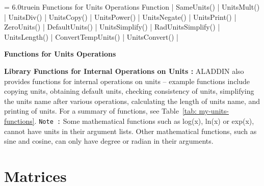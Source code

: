 \begin{table}[p]
\tablewidth = 6.0truein
\begintable
{}\tstrut\hfil Functions for Units Operations    \hfil\crthick
Function           |                        \cr
SameUnits()        |        \cr
UnitsMult()        |                         \cr
UnitsDiv()         |                           \cr
UnitsCopy()        |                      \cr
UnitsPower()       |           \cr
UnitsNegate()      |                      \cr
UnitsPrint()       |    \cr
ZeroUnits()        |                                        \cr
DefaultUnits()     |  \cr
UnitsSimplify()    |   \cr
RadUnitsSimplify() |         \cr
UnitsLength()      |          \cr
ConvertTempUnits() |      \cr
UnitsConvert()     | 
\endtable
\vspace{0.01 in}
\caption{\bf Functions for Units Operations}
\label{tab: my-units-functions}
\end{table}

\vspace{0.20 in}\noindent
{\bf Library Functions for Internal Operations on Units :}
ALADDIN also provides functions for internal operations
on units -- example functions include copying units,
obtaining default units, checking consistency of units,
simplifying the units name after various operations,
calculating the length of units name,
and printing of units. For a summary of functions,
see Table~\ref{tab: my-units-functions}.
{\tt Note :} Some mathematical functions such as
log(x), ln(x) or exp(x), cannot have units in their argument lists.
Other mathematical functions, such as sine and cosine,
can only have degree or radian in their arguments.

\clearpage
\section{Matrices}

